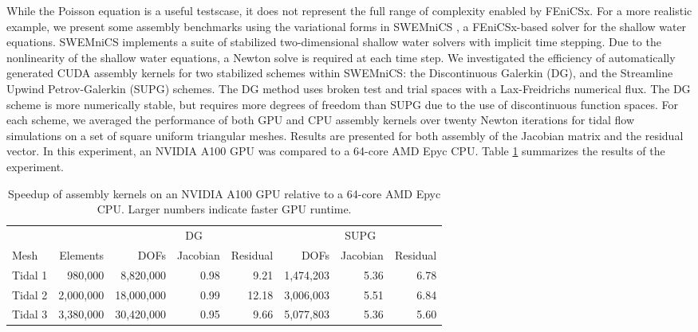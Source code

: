 While the Poisson equation is a useful testscase, it does not represent the full range of complexity enabled by FEniCSx. For a more realistic example, we present some assembly benchmarks using the variational forms in SWEMniCS \citep{dawson2024swemnics}, a FEniCSx-based solver for the shallow water equations. SWEMniCS implements a suite of stabilized two-dimensional shallow water solvers with implicit time stepping. Due to the nonlinearity of the shallow water equations, a Newton solve is required at each time step. We investigated the efficiency of automatically generated CUDA assembly kernels for two stabilized schemes within SWEMniCS: the Discontinuous Galerkin (DG), and the Streamline Upwind Petrov-Galerkin (SUPG) schemes. The DG method uses broken test and trial spaces with a Lax-Freidrichs numerical flux. The DG scheme is more numerically stable, but requires more degrees of freedom than SUPG due to the use of discontinuous function spaces. For each scheme, we averaged the performance of both GPU and CPU assembly kernels over twenty Newton iterations for tidal flow simulations on a set of square uniform triangular meshes. Results are presented for both assembly of the Jacobian matrix and the residual vector. In this experiment, an NVIDIA A100 GPU was compared to a 64-core AMD Epyc CPU.
Table \ref{tab:swe_a100_vs_epyc} summarizes the results of the experiment.
\begin{table}[t]
    \centering
    \begin{tabular}{lrrrrrrr}
\toprule
        &           &           \multicolumn{3}{c}{DG} & \multicolumn{3}{c}{SUPG} \\
                                  \cmidrule(lr){3-5}       \cmidrule(lr){6-8}
Mesh    &  Elements &  DOFs & Jacobian & Residual  & DOFs  & Jacobian & Residual \\
\midrule
Tidal 1 &   980,000 &   8,820,000 &     0.98 &    9.21 &  1,474,203 &   5.36 &     6.78 \\
Tidal 2 & 2,000,000 & 18,000,000 &     0.99 &     12.18 &  3,006,003 &   5.51 &     6.84 \\
Tidal 3 & 3,380,000 & 30,420,000 &     0.95 &      9.66 &  5,077,803 &   5.36 &     5.60 \\
\bottomrule
\end{tabular}
    \caption{Speedup of assembly kernels on an NVIDIA A100 GPU relative to a 64-core AMD Epyc CPU. Larger numbers indicate faster GPU runtime.}
    \label{tab:swe_a100_vs_epyc}
\end{table}

